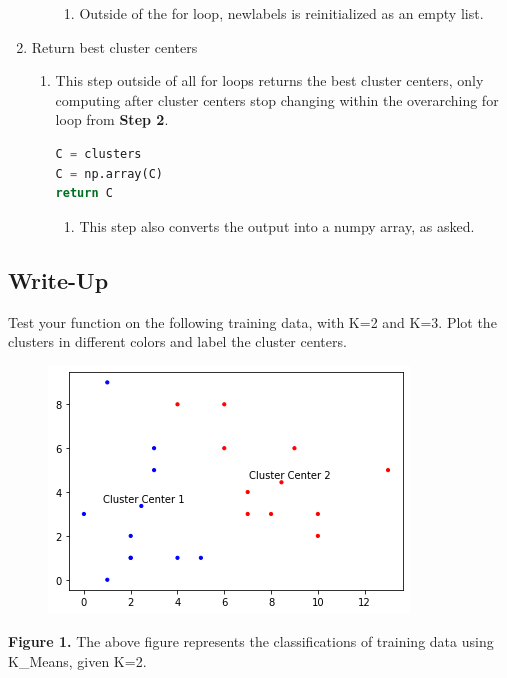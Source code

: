\documentclass[11pt]{article}
\theoremstyle{definition}
\begin{document}
\begin{enumerate}
\begin{enumerate}
\begin{enumerate}
            \item Outside of the for loop, \textsf{newlabels} is reinitialized as an empty list.
        \end{enumerate}
    \end{enumerate}
    \item Return best cluster centers
    \begin{enumerate}
        \item This step outside of all for loops returns the best cluster centers, only computing after cluster centers stop changing within the overarching for loop from \textbf{Step 2}.
\begin{lstlisting}[language=python, frame=single]
C = clusters
C = np.array(C)
return C
\end{lstlisting}
        \begin{enumerate}
            \item This step also converts the output into a \textsf{numpy} array, as asked.
        \end{enumerate}
    \end{enumerate}
\end{enumerate}

\clearpage
\subsection{Write-Up}
\begin{shaded}
Test your function on the following training data, with K=2 and K=3. Plot the clusters in different colors and label the cluster centers.
\end{shaded}

\begin{figure}[hbt!]
 \centering
 \includegraphics[scale=0.90]{Clustering_plot1}
\end{figure}
\textbf{Figure 1.} The above figure represents the classifications of training data using \textsf{K\_Means}, given K=2. 
\end{document}
